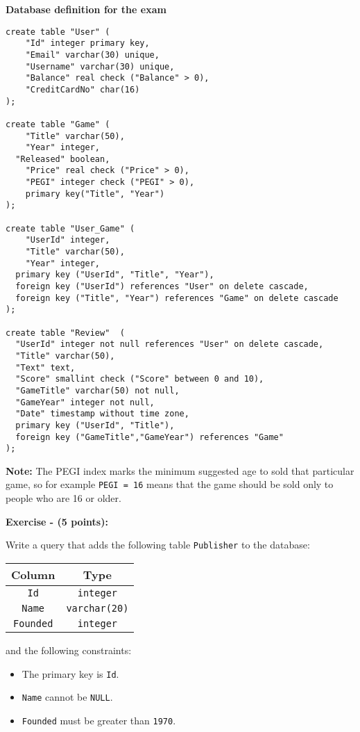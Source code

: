 \documentclass[10pt,a4paper]{article}
\title{\courseCode}
\date {  }
\newcounter{ExerciseCount}
\newcommand{\exercise}[2]{\noindent \textbf{Exercise \theExerciseCount \space - (#2 points):}
  
  \vspace{0.15cm}
  \noindent
 #1 \addtocounter{ExerciseCount}{1}
}
\begin{document}
%
\maketitle

\huge
\textbf{Database definition for the exam}
\normalsize


\begin{lstlisting}[frame=single]
create table "User" (
	"Id" integer primary key,
	"Email" varchar(30) unique,
	"Username" varchar(30) unique,
	"Balance" real check ("Balance" > 0),
	"CreditCardNo" char(16)
);

create table "Game" (
	"Title" varchar(50),
	"Year" integer,
  "Released" boolean,
	"Price" real check ("Price" > 0),
	"PEGI" integer check ("PEGI" > 0),
	primary key("Title", "Year")
);

create table "User_Game" (
	"UserId" integer,
	"Title" varchar(50),
	"Year" integer,
  primary key ("UserId", "Title", "Year"),
  foreign key ("UserId") references "User" on delete cascade,
  foreign key ("Title", "Year") references "Game" on delete cascade
);

create table "Review"  (
  "UserId" integer not null references "User" on delete cascade,
  "Title" varchar(50),
  "Text" text,
  "Score" smallint check ("Score" between 0 and 10),
  "GameTitle" varchar(50) not null,
  "GameYear" integer not null,
  "Date" timestamp without time zone, 
  primary key ("UserId", "Title"),
  foreign key ("GameTitle","GameYear") references "Game"
);
\end{lstlisting}

\noindent
\textbf{Note:} The PEGI index marks the minimum suggested age to sold that particular game, so for example \texttt{PEGI = 16} means that the game should be sold only to people who are 16 or older.

\newpage

\exercise{
  \noindent
  Write a query that adds the following table \texttt{Publisher} to the database:
    \begin{table}[!h]
      \centering
      \begin{tabular}{|c|c|}
        \hline
        \textbf{Column} & \textbf{Type}\\
        \hline
        \texttt{Id} & \texttt{integer}\\
        \hline
        \texttt{Name} & \texttt{varchar(20)}\\
        \hline
        \texttt{Founded} & \texttt{integer}\\
        \hline
      \end{tabular}
    \end{table}
    and the following constraints:
    \begin{itemize}[noitemsep]
    \item The primary key is \texttt{Id}.
    \item \texttt{Name} cannot be \texttt{NULL}.
    \item \texttt{Founded} must be greater than \texttt{1970}. 
    \end{itemize}
}{5}
\end{document}

